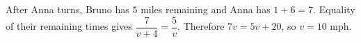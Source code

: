 After Anna turns, Bruno has $5$ miles remaining and Anna has $1+6=7$. Equality of their remaining times gives $\dfrac{7}{v+4}=\dfrac{5}{v}$. Therefore $7v=5v+20$, so $\boxed{v=10\text{ mph}}$.
